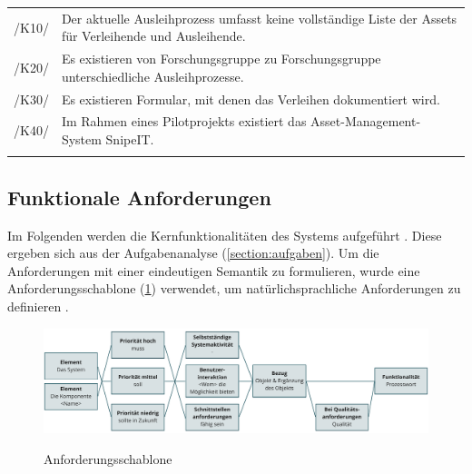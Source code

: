 \begin{center}
        \renewcommand{\arraystretch}{1.5}
        \begin{longtable}{lp{}}
                \arrayrulecolor{maincolor}\hline
                 \sffamily\color{maincolor}/K10/ & Der aktuelle Ausleihprozess umfasst keine
                 vollständige Liste der Assets für Verleihende und Ausleihende. \\
                 \sffamily\color{maincolor}/K20/ & Es existieren von Forschungsgruppe zu Forschungsgruppe
                unterschiedliche Ausleihprozesse. \\
                \sffamily\color{maincolor}/K30/ & Es existieren Formular, mit denen das Verleihen
                dokumentiert wird. \\
                \sffamily\color{maincolor}/K40/ & Im Rahmen eines Pilotprojekts existiert das
                Asset-Management-System SnipeIT. \\
                \arrayrulecolor{maincolor}\hline
        \end{longtable}
\end{center}

\vspace*{-1.5cm}

\subsection{Funktionale Anforderungen}
\label{section:funktionale}
Im Folgenden werden die Kernfunktionalitäten des Systems aufgeführt \cite{balzert2009}. Diese
ergeben sich aus der Aufgabenanalyse (\ref{section:aufgaben}). Um die Anforderungen mit einer
eindeutigen Semantik zu formulieren, wurde eine Anforderungsschablone (\ref{fig:schablone})
verwendet, um natürlichsprachliche Anforderungen zu definieren \cite{balzert2009}.

\begin{figure}[h]
        \centering
        \includegraphics[scale=0.45]{Bilder/anforderungsschablone.pdf}
        \label{fig:schablone}
        \caption[Anforderungsschablone]{Anforderungsschablone \cite{balzert2009}}
\end{figure}


